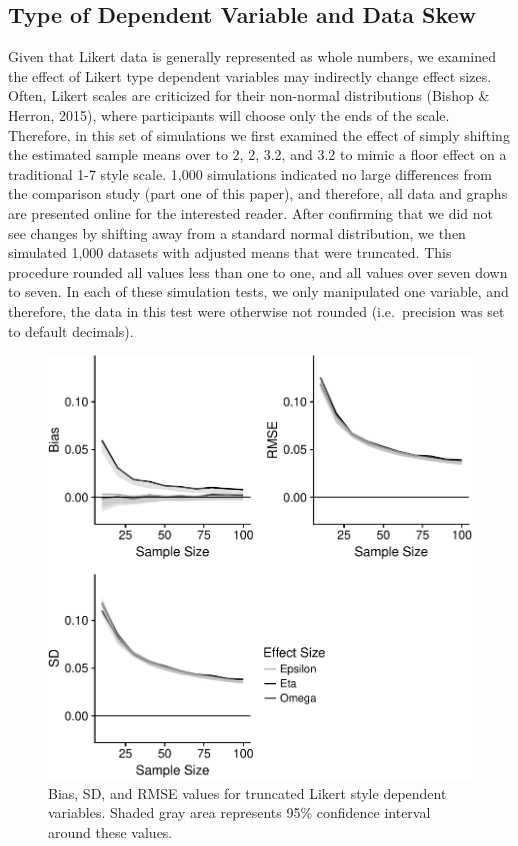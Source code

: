 \documentclass[english,man]{apa6}
\theoremstyle{definition}
\theoremstyle{definition}
\theoremstyle{definition}
\theoremstyle{remark}
\begin{document}
\subsection{Type of Dependent Variable and Data
Skew}\label{type-of-dependent-variable-and-data-skew}

Given that Likert data is generally represented as whole numbers, we
examined the effect of Likert type dependent variables may indirectly
change effect sizes. Often, Likert scales are criticized for their
non-normal distributions (Bishop \& Herron, 2015), where participants
will choose only the ends of the scale. Therefore, in this set of
simulations we first examined the effect of simply shifting the
estimated sample means over to 2, 2, 3.2, and 3.2 to mimic a floor
effect on a traditional 1-7 style scale. 1,000 simulations indicated no
large differences from the comparison study (part one of this paper),
and therefore, all data and graphs are presented online for the
interested reader. After confirming that we did not see changes by
shifting away from a standard normal distribution, we then simulated
1,000 datasets with adjusted means that were truncated. This procedure
rounded all values less than one to one, and all values over seven down
to seven. In each of these simulation tests, we only manipulated one
variable, and therefore, the data in this test were otherwise not
rounded (i.e.~precision was set to default decimals).

\begin{figure}
\centering
\includegraphics{buchanan_scofield_version2_files/figure-latex/likerttrun-graph-1.pdf}
\caption{\label{fig:likerttrun-graph}Bias, SD, and RMSE values for truncated
Likert style dependent variables. Shaded gray area represents 95\%
confidence interval around these values.}
\end{figure}
\end{document}
